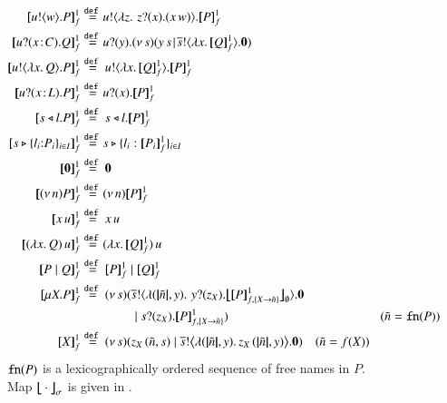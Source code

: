 
\begin{figure}[t!]


\begin{align*}
	\pmapp{\bout{u}{w} P}{1}{f}	&\defeq	\!\bout{u}{ \abs{z}{\,\binp{z}{x} (\appl{x}{w})} } \pmapp{P}{1}{f}
	\\
	\pmapp{\binp{u}{\AT{x}{C}} Q}{1}{f}	&\defeq	\!\binp{u}{y} \newsp{s}{\appl{y}{s} \!\Par\! \bout{\dual{s}}{\abs{x}{\pmapp{Q}{1}{f}}} \inact}
		\\
	\pmapp{\bout{u}{\abs{{x}}{Q}} P}{1}{f}  &\defeq \bout{u}{\abs{{x}}{\pmapp{Q}{1}{f}}} \pmapp{P}{1}{f}
	\\
	\pmapp{\binp{u}{\AT{x}{L}} P}{1}{f} &\defeq \!\binp{u}{x} \pmapp{P}{1}{f}
	\\
	\pmapp{\bsel{s}{l} P}{1}{f} &\defeq \bsel{s}{l} \pmapp{P}{1}{f}
	\\
	\pmapp{\bbra{s}{l_i{:}P_i}_{i \in I}}{1}{f} &\defeq \!\bbra{s}{l_i: \pmapp{P_i}{1}{f}}_{i \in I}
	\\
	\pmapp{\inact}{1}{f} &\defeq \inact
	\\
	\pmapp{\news{n} P}{1}{f} &\defeq \!\news{n} \pmapp{P}{1}{f}
	\\
	\pmapp{{x}\, {u}}{1}{f} &\defeq \appl{x}{u}
	\\
	\pmapp{\appl{(\abs{x}{Q})}{u}}{1}{f} &\defeq \!\appl{(\abs{x}{\pmapp{Q}{1}{f}})}{u}
	\\	
	\pmapp{P \Par Q}{1}{f} & \defeq \pmapp{P}{1}{f} \Par \pmapp{Q}{1}{f}
	\\
	\pmapp{\recp{X}{P}}{1}{f} &\defeq
		\newsp{s}{\bout{\dual{s}}{\abs{(\vmap{\tilde{n}}, y)} \,{\binp{y}{z_\X} \auxmapp{\pmapp{P}{1}{{f,\{\rvar{X}\to \tilde{n}\}}}}{{}}{\es}}} \inact 
		\\
		& \qquad \qquad \Par  \binp{s}{z_\X} \pmapp{P}{1}{{f,\{\rvar{X}\to \tilde{n}\}}}}
	\qquad \qquad \qquad \qquad \qquad \qquad
	(\tilde{n} = \fn{P})
	\\ 
	\pmapp{\rvar{X}}{1}{f} & \defeq 
		\newsp{s}{\appl{z_X}{(\tilde{n}, s)} \Par \bbout{\dual{s}}{ \abs{(\vmap{\tilde{n}},y)}{\appl{z_X}{(\vmap{\tilde{n}}, y)}}} \inact}  \quad (\tilde{n} = f(\rvar{X}))
\end{align*}
$\mathtt{fn}(P)$ is a lexicographically ordered sequence  of free names in $P$.
Map
$\big\lfloor\!\!\big\lfloor\cdot\big\rfloor\!\!\big\rfloor^{}_\sigma$ is given in 
.
\\[1mm]
\begin{align*}

\end{align*}
\end{figure}
